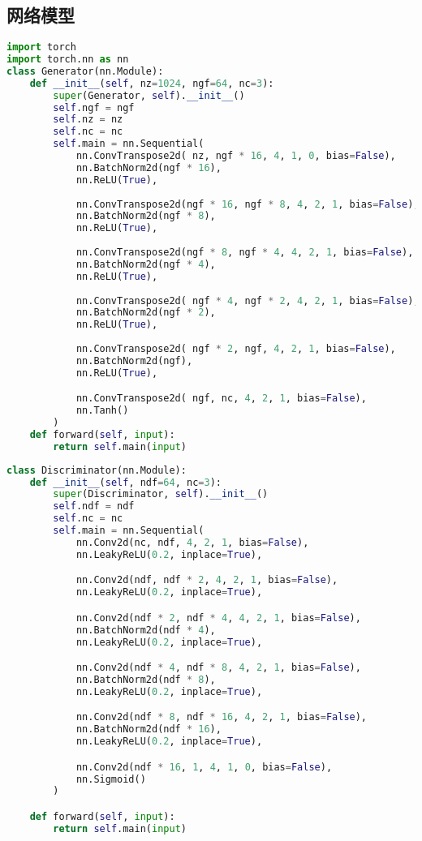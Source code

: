\documentclass{report}
\begin{document}
\subsection{网络模型}
\begin{lstlisting}[language=Python, caption=生成器, label=code:generator]
import torch
import torch.nn as nn
class Generator(nn.Module):
    def __init__(self, nz=1024, ngf=64, nc=3):
        super(Generator, self).__init__()
        self.ngf = ngf 
        self.nz = nz 
        self.nc = nc 
        self.main = nn.Sequential(
            nn.ConvTranspose2d( nz, ngf * 16, 4, 1, 0, bias=False),
            nn.BatchNorm2d(ngf * 16),
            nn.ReLU(True),
            
            nn.ConvTranspose2d(ngf * 16, ngf * 8, 4, 2, 1, bias=False),
            nn.BatchNorm2d(ngf * 8),
            nn.ReLU(True),
            
            nn.ConvTranspose2d(ngf * 8, ngf * 4, 4, 2, 1, bias=False),
            nn.BatchNorm2d(ngf * 4),
            nn.ReLU(True),
            
            nn.ConvTranspose2d( ngf * 4, ngf * 2, 4, 2, 1, bias=False),
            nn.BatchNorm2d(ngf * 2),
            nn.ReLU(True),
            
            nn.ConvTranspose2d( ngf * 2, ngf, 4, 2, 1, bias=False),
            nn.BatchNorm2d(ngf),
            nn.ReLU(True),

            nn.ConvTranspose2d( ngf, nc, 4, 2, 1, bias=False),
            nn.Tanh()
        )
    def forward(self, input):
        return self.main(input)
\end{lstlisting}

\begin{lstlisting}[language=Python, caption=判别器, label=code:discriminator]
class Discriminator(nn.Module):
    def __init__(self, ndf=64, nc=3):
        super(Discriminator, self).__init__()
        self.ndf = ndf 
        self.nc = nc 
        self.main = nn.Sequential(
            nn.Conv2d(nc, ndf, 4, 2, 1, bias=False),
            nn.LeakyReLU(0.2, inplace=True),

            nn.Conv2d(ndf, ndf * 2, 4, 2, 1, bias=False),
            nn.LeakyReLU(0.2, inplace=True),

            nn.Conv2d(ndf * 2, ndf * 4, 4, 2, 1, bias=False),
            nn.BatchNorm2d(ndf * 4),
            nn.LeakyReLU(0.2, inplace=True),

            nn.Conv2d(ndf * 4, ndf * 8, 4, 2, 1, bias=False),
            nn.BatchNorm2d(ndf * 8),
            nn.LeakyReLU(0.2, inplace=True),

            nn.Conv2d(ndf * 8, ndf * 16, 4, 2, 1, bias=False),
            nn.BatchNorm2d(ndf * 16),
            nn.LeakyReLU(0.2, inplace=True),

            nn.Conv2d(ndf * 16, 1, 4, 1, 0, bias=False),
            nn.Sigmoid()
        )

    def forward(self, input):
        return self.main(input)
\end{lstlisting}
\end{document}
